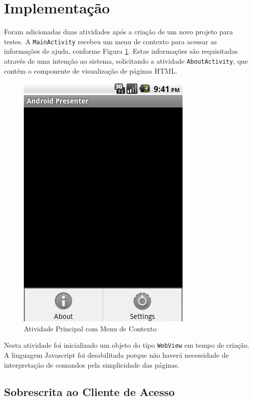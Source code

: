 \documentclass{article}
\begin{document}
\section{Implementação}
\label{sec:implementacao}

Foram adicionadas duas atividades após a criação de um novo projeto para testes.
A \texttt{MainActivity} recebeu um menu de contexto para acessar as informações
de ajuda, conforme Figura \ref{fig:main}. Estas informações são requisitadas
através de uma intenção ao sistema, solicitando a atividade
\texttt{AboutActivity}, que contém o componente de visualização de páginas HTML.

\begin{figure}
    \centering{}
    \includegraphics[scale=0.4]{figura01.png}
    \caption{Atividade Principal com Menu de Contexto}
    \label{fig:main}
\end{figure}

Nesta atividade foi inicializado um objeto do tipo \texttt{WebView} em tempo de
criação. A linguagem Javascript foi desabilitada porque não haverá necessidade
de interpretação de comandos pela simplicidade das páginas.

\subsection{Sobrescrita ao Cliente de Acesso}
\end{document}
